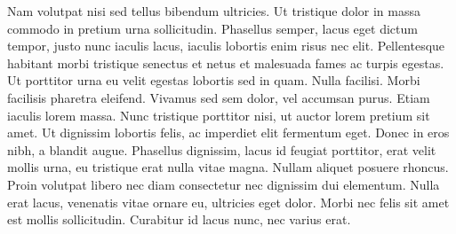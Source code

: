 Nam volutpat nisi sed tellus bibendum ultricies. Ut tristique dolor in
massa commodo in pretium urna sollicitudin. Phasellus semper, lacus eget
dictum tempor, justo nunc iaculis lacus, iaculis lobortis enim risus nec
elit. Pellentesque habitant morbi tristique senectus et netus et
malesuada fames ac turpis egestas. Ut porttitor urna eu velit egestas
lobortis sed in quam. Nulla facilisi. Morbi facilisis pharetra
eleifend. Vivamus sed sem dolor, vel accumsan purus. Etiam iaculis lorem
massa. Nunc tristique porttitor nisi, ut auctor lorem pretium sit
amet. Ut dignissim lobortis felis, ac imperdiet elit fermentum
eget. Donec in eros nibh, a blandit augue. Phasellus dignissim, lacus id
feugiat porttitor, erat velit mollis urna, eu tristique erat nulla vitae
magna. Nullam aliquet posuere rhoncus. Proin volutpat libero nec diam
consectetur nec dignissim dui elementum. Nulla erat lacus, venenatis
vitae ornare eu, ultricies eget dolor. Morbi nec felis sit amet est
mollis sollicitudin. Curabitur id lacus nunc, nec varius erat.

\begin{singlespacing}
\pagestyle{empty}
\tableofcontents
\end{singlespacing}
\pagestyle{fancy}
